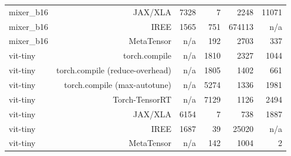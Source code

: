 \begin{tabular}{lrrrrr}
mixer\_b16 & JAX/XLA & 7328 & 7 & 2248 & 11071 \\
mixer\_b16 & IREE & 1565 & 751 & 674113 & n/a \\
mixer\_b16 & MetaTensor & n/a & 192 & 2703 & 337 \\
vit-tiny & torch.compile & n/a & 1810 & 2327 & 1044 \\
vit-tiny & torch.compile (reduce-overhead) & n/a & 1805 & 1402 & 661 \\
vit-tiny & torch.compile (max-autotune) & n/a & 5274 & 1336 & 1981 \\
vit-tiny & Torch-TensorRT & n/a & 7129 & 1126 & 2494 \\
vit-tiny & JAX/XLA & 6154 & 7 & 738 & 1887 \\
vit-tiny & IREE & 1687 & 39 & 25020 & n/a \\
vit-tiny & MetaTensor & n/a & 142 & 1004 & 2 \\
\bottomrule
\end{tabular}
